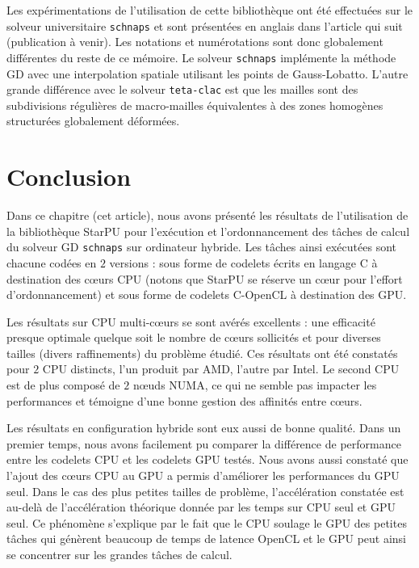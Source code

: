 Les expérimentations de l'utilisation de cette bibliothèque ont été
effectuées sur le solveur universitaire \texttt{schnaps}
\cite{helluy2016asynchronous} et
sont présentées en anglais dans l'article qui suit
(publication à venir).
Les notations et numérotations sont donc globalement différentes
du reste de ce mémoire.
Le solveur \texttt{schnaps} implémente la méthode GD avec
une interpolation spatiale utilisant les points de Gauss-Lobatto.
L'autre grande différence avec le solveur \texttt{teta-clac} est que
les mailles sont des subdivisions régulières de macro-mailles
équivalentes à des zones homogènes structurées globalement déformées.









\section*{Conclusion}


Dans ce chapitre (cet article), nous avons présenté les résultats
de l'utilisation de la bibliothèque StarPU pour l'exécution
et l'ordonnancement des tâches de calcul du solveur GD \texttt{schnaps}
sur ordinateur hybride.
Les tâches ainsi exécutées sont chacune codées en $2$ versions :
sous forme de codelets écrits en langage C à destination des cœurs CPU
(notons que StarPU se réserve un cœur pour l'effort d'ordonnancement)
et sous forme de codelets C-OpenCL à destination des GPU.

Les résultats sur CPU multi-cœurs se sont avérés excellents :
une efficacité presque optimale quelque soit le nombre de cœurs
sollicités et pour diverses tailles (divers raffinements) du problème étudié.
Ces résultats ont été constatés pour $2$ CPU distincts,
l'un produit par AMD, l'autre par Intel. Le second CPU
est de plus composé de $2$ nœuds NUMA, ce qui ne semble pas
impacter les performances et témoigne d'une bonne gestion des
affinités entre cœurs.

Les résultats en configuration hybride sont eux aussi
de bonne qualité. Dans un premier temps, nous avons facilement
pu comparer la différence de performance entre les codelets
CPU et les codelets GPU testés.
Nous avons aussi constaté que l'ajout des cœurs CPU au GPU
a permis d'améliorer les performances du GPU seul.
Dans le cas des plus petites tailles de problème,
l'accélération constatée est au-delà de
l'accélération théorique donnée par les temps sur CPU seul et GPU seul.
Ce phénomène s'explique par le fait que le CPU soulage
le GPU des petites tâches qui génèrent beaucoup de temps de latence OpenCL
et le GPU peut ainsi se concentrer sur les grandes tâches de calcul.


